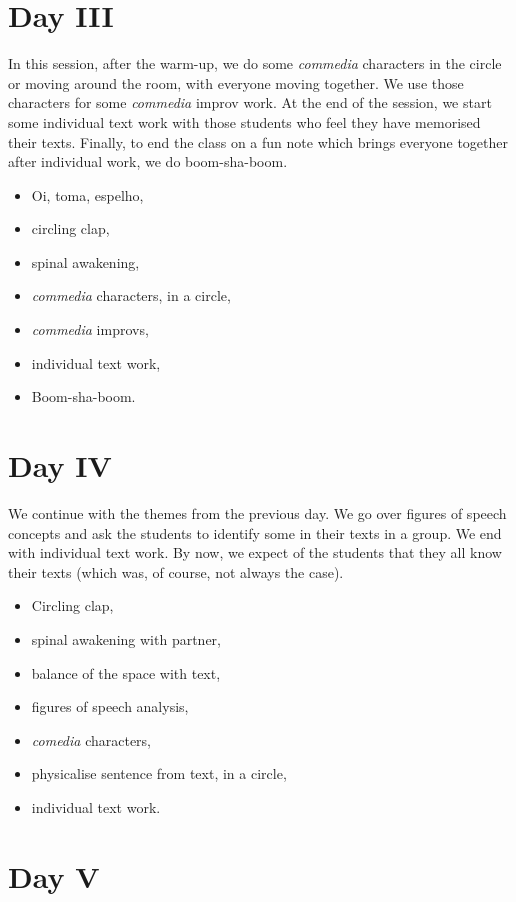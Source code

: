 \documentclass[article,twocolumn,twoside]{memoir}
\begin{document}
\section{Day III}
In this session, after the warm-up, we do some \textit{commedia} characters in
the circle or moving around the room, with everyone moving together. We use
those characters for some \textit{commedia} improv work. At the end of the
session, we start some individual text work with those students who feel they
have memorised their texts. Finally, to end the class on a fun note which
brings everyone together after individual work, we do boom-sha-boom.

\begin{itemize}
\item Oi, toma, espelho,
\item circling clap,
\item spinal awakening,
\item \textit{commedia} characters, in a circle,
\item \textit{commedia} improvs,
\item individual text work,
\item Boom-sha-boom.
\end{itemize}
\section{Day IV}

We continue with the themes from the previous day. We go over figures of speech
concepts and ask the students to identify some in their texts in a group. We
end with individual text work. By now, we expect of the students that they all
know their texts (which was, of course, not always the case).

\begin{itemize}
\item Circling clap,
\item spinal awakening with partner,
\item balance of the space with text,
\item figures of speech analysis,
\item \textit{comedia} characters,
\item physicalise sentence from text, in a circle,
\item individual text work.
\end{itemize}
\section{Day V}
\end{document}

